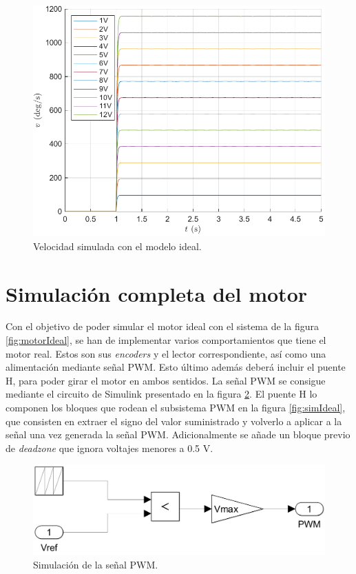 \documentclass{article}
\begin{document}
\begin{figure}[H]
    \centering
    \includegraphics[width=0.75\linewidth]{img/velocidadIdeal.pdf}
    \caption{Velocidad simulada con el modelo ideal.}
    \label{fig:velocidadIdeal}
\end{figure}


\section{Simulación completa del motor}

Con el objetivo de poder simular el motor ideal con el sistema de la figura \ref{fig:motorIdeal}, se han de implementar varios comportamientos que tiene el motor real. Estos son sus \textit{encoders} y el lector correspondiente, así como una alimentación mediante señal PWM. Esto último además deberá incluir el puente H, para poder girar el motor en ambos sentidos. La señal PWM se consigue mediante el circuito de Simulink presentado en la figura \ref{fig:PWM}. El puente H lo componen los bloques que rodean el subsistema PWM en la figura \ref{fig:simIdeal}, que consisten en extraer el signo del valor suministrado y volverlo a aplicar a la señal una vez generada la señal PWM. Adicionalmente se añade un bloque previo de \textit{deadzone} que ignora voltajes menores a 0.5 V.

\begin{figure}[H]
    \centering
    \includegraphics[width=0.75\linewidth]{img/PWM.png}
    \caption{Simulación de la señal PWM.}
    \label{fig:PWM}
\end{figure}
\end{document}
